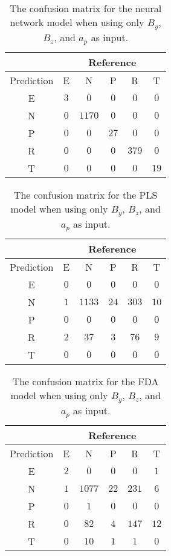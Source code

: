 \begin{table}[!ht]
	\centering
	\begin{tabular}{|c|c|c|c|c|c|}
		\hline
		 & \multicolumn{5}{|c|}{Reference} \\ \hline
		 Prediction & E & N & P & R & T \\ \hline
		 E & $3$ & $0$ & $0$ & $0$ & $0$ \\ \hline
		 N & $0$ & $1170$ & $0$ & $0$ & $0$ \\ \hline
		 P & $0$ & $0$ & $27$ & $0$ & $0$ \\ \hline
		 R & $0$ & $0$ & $0$ & $379$ & $0$ \\ \hline
		 T & $0$ & $0$ & $0$ & $0$ & $19$ \\ \hline
	\end{tabular}
	\caption{The confusion matrix for the neural network model when using only $B_{y}$, $B_{z}$, and $a_{p}$ as input.}
	\label{tab:cm:yzap:nnet}
\end{table}

\begin{table}[!ht]
	\centering
	\begin{tabular}{|c|c|c|c|c|c|}
		\hline
		 & \multicolumn{5}{|c|}{Reference} \\ \hline
		 Prediction & E & N & P & R & T \\ \hline
		 E & $0$ & $0$ & $0$ & $0$ & $0$ \\ \hline
		 N & $1$ & $1133$ & $24$ & $303$ & $10$ \\ \hline
		 P & $0$ & $0$ & $0$ & $0$ & $0$ \\ \hline
		 R & $2$ & $37$ & $3$ & $76$ & $9$ \\ \hline
		 T & $0$ & $0$ & $0$ & $0$ & $0$ \\ \hline
	\end{tabular}
	\caption{The confusion matrix for the PLS model when using only $B_{y}$, $B_{z}$, and $a_{p}$ as input.}
	\label{tab:cm:yzap:pls}
\end{table}

\begin{table}[!ht]
	\centering
	\begin{tabular}{|c|c|c|c|c|c|}
		\hline
		 & \multicolumn{5}{|c|}{Reference} \\ \hline
		 Prediction & E & N & P & R & T \\ \hline
		 E & $2$ & $0$ & $0$ & $0$ & $1$ \\ \hline
		 N & $1$ & $1077$ & $22$ & $231$ & $6$ \\ \hline
		 P & $0$ & $1$ & $0$ & $0$ & $0$ \\ \hline
		 R & $0$ & $82$ & $4$ & $147$ & $12$ \\ \hline
		 T & $0$ & $10$ & $1$ & $1$ & $0$ \\ \hline
	\end{tabular}
	\caption{The confusion matrix for the FDA model when using only $B_{y}$, $B_{z}$, and $a_{p}$ as input.}
	\label{tab:cm:yzap:fda}
\end{table}

